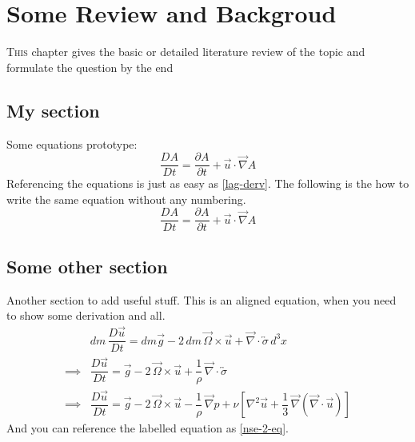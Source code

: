 \chapter{Some Review and Backgroud}
\lettrine[lines=1]{T}{his} chapter gives the basic or detailed literature review of the topic and formulate the question by the end

\section{My section}
Some equations prototype:
\begin{equation}
    \label{lag-derv}
    \dfrac{DA}{Dt} = \dfrac{\partial A}{\partial t} + \vec{u} \cdot \vec{\nabla} A
\end{equation}
Referencing the equations is just as easy as \autoref{lag-derv}. The following is the how to write the same equation without any numbering.
\begin{equation*}
    \dfrac{DA}{Dt} = \dfrac{\partial A}{\partial t} + \vec{u} \cdot \vec{\nabla} A
\end{equation*}

\section{Some other section}
Another section to add useful stuff. This is an aligned equation, when you need to show some derivation and all.
\begin{align}
    & dm \, \dfrac{D \vec{u}}{Dt} = dm \vec{g} - 2 \, dm \, \vec{\Omega} \times \vec{u} + \vec{\nabla} \cdot \overleftrightarrow{\sigma} \, d^3x \nonumber \\ %
    \implies & \dfrac{D \vec{u}}{Dt} = \vec{g} - 2 \, \vec{\Omega} \times \vec{u} + \dfrac{1}{\rho} \, \vec{\nabla} \cdot \overleftrightarrow{\sigma} \\ %
    \implies & \dfrac{D \vec{u}}{Dt} = \vec{g} - 2 \, \vec{\Omega} \times \vec{u} - \dfrac{1}{\rho} \, \vec{\nabla} p + \nu \left[ \nabla^2 \vec{u} + \dfrac{1}{3} \, \vec{\nabla} (\vec{\nabla} \cdot \vec{u}) \right] \label{nse-2-eq} %
\end{align}
And you can reference the labelled equation as \autoref{nse-2-eq}.
